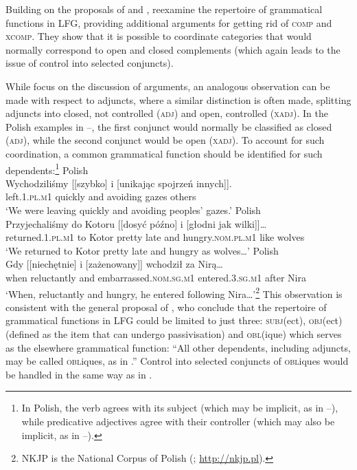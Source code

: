 \documentclass[output=paper]{../langscibook}
\begin{document}
\noindent
Building on the proposals of \citet{AMM05} and
\citet{PatejukPrzepiorkowski2014}, \citet{patejuk2016reducing} reexamine the
repertoire of grammatical functions in LFG, providing additional
arguments for getting rid of \textsc{comp} and \textsc{xcomp}. They
show that it is possible to coordinate categories that would
normally correspond to open and closed complements (which again leads to the
issue of control into selected conjuncts).

While \citet{patejuk2016reducing} focus on the discussion of arguments, an
analogous observation can be made with respect to adjuncts, where a
similar distinction is often made, splitting adjuncts into closed, not
controlled (\textsc{adj}) and open, controlled (\textsc{xadj}). In the
Polish examples in
–, the first conjunct would normally be
classified as closed (\textsc{adj}), while the second conjunct would
be open (\textsc{xadj}). To account for such coordination, a common
grammatical function should be identified for such
dependents:\footnote{In Polish, the verb agrees with its subject
  (which may be implicit, as in –), while predicative adjectives agree with
  their controller (which may also be implicit, as in –).}
\ea\label{ex:unlikes:ADVmod:PACTmod}Polish\\\gll
Wychodziliśmy [[szybko] i [unikając spojrzeń innych]]. \\
left.\textsc{1.pl.m1} \phtm{[[}quickly and \phtm{[}avoiding gazes others\\
\glt`We were leaving quickly and avoiding peoples' gazes.'\z
\ea\label{ex:unlikes:ADVmod:APPREDmod:mid}Polish\\\gll
Przyjechaliśmy do Kotoru [[dosyć późno] i [głodni jak wilki]]… \\
returned.\textsc{1.pl.m1} to Kotor \phtm{[[}pretty late and \phtm{[}hungry.\textsc{nom.pl.m1} like wolves\\
\glt`We returned to Kotor pretty late and hungry as wolves…'\ggl\z
\ea\label{ex:unlikes:ADVmod:APPREDmod}
  Polish\\\gll
    Gdy [[niechętnie] i [zażenowany]] wchodził za Nirą… \\
    when \phtm{[[}reluctantly and \phtm{[}embarrassed.\textsc{nom.sg.m1} entered.\textsc{3.sg.m1} after Nira\\
\glt‘When, reluctantly and hungry, he entered following
  Nira…’\nkjp\footnote{NKJP is the National Corpus of Polish
    (\citet{prz:etal:11a,prz:etal:11:ed}; \url{http://nkjp.pl}).}
\z
This observation is consistent with the general proposal of
\citet[549]{patejuk2016reducing}, who conclude that the repertoire of grammatical
functions in LFG could be limited to just three: \textsc{subj}(ect), \textsc{obj}(ect)
(defined as the item that can undergo passivisation) and \textsc{obl}(ique) which
serves as the elsewhere grammatical function: ``All other dependents,
including adjuncts, may be called \textsc{obl}iques, as in
\citet{alsina1996the-role}.'' Control into selected conjuncts of
\textsc{obl}iques would be handled in the same way as in .
\end{document}
